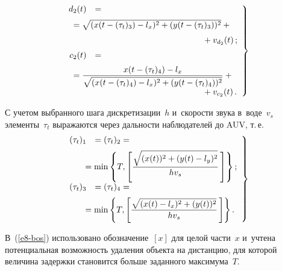 \begin{multicols}{2}
\noindent
 \begin{equation}
     \left.
     \begin{array}{rl}
          d_2(t)&= {}\\[6pt]
     & \hspace*{-10mm}{}=\sqrt{(x(t-(\tau_t)_3)-l_x)^2 + (y(t-(\tau_t)_3))^2}+{}\\[6pt]
&    \hspace*{45mm} {}+v_{d_2}(t)\,;\\[6pt]
     c_2(t) &={}\\[6pt]
     & \hspace*{-10mm}{}= \fr{x(t-(\tau_t)_4)-l_x} {\sqrt{(x(t-(\tau_t)_4)-l_x)^2 +(y(t-(\tau_t)_4))^2}}+{}\\[6pt]
     &\hspace*{45mm}{}+v_{c_2}(t)\,.
     \end{array}
     \right\}
     \label{e7-bos}
     \end{equation}
     
     С учетом выбранного шага дискретизации~$h$ и~ско\-рости звука 
в~воде~$v_s$ элементы~$\tau_t$ выражаются через даль\-ности наблюдателей 
до AUV, т.\,е.
     \begin{equation}
     \left.
     \begin{array}{rl}
     (\tau_t)_1 &= (\tau_t)_2={}\\[6pt]
     &\hspace*{-5mm}{}=\min \left\{ T, \left[\fr{\sqrt{(x(t))^2+(y(t)-l_y)^2}}{hv_s}\,\right]\right\};\\[9pt]
     (\tau_t)_3&=(\tau_t)_4= {}\\[6pt]
&     \hspace*{-5mm}{}=\min\left\{ T, \left[\fr{\sqrt{(x(t)-l_x)^2 +(y(t))^2}}{hv_s}\,\right]\right\}.
     \end{array}
     \right\}
     \label{e8-bos}
     \end{equation}
     
     В~(\ref{e8-bos}) использовано обозначение~$[x]$ для целой час\-ти~$x$ 
и~учте\-на потенциальная воз\-мож\-ность удаления объекта на дис\-тан\-цию, для 
которой величина за\-держ\-ки становится больше заданного мак\-си\-му\-ма~$T$.
     

\end{multicols}
